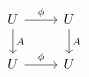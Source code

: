 \documentclass[12pt]{standalone}
\begin{document}
        $$

\begin{tikzcd}
    U \ar[r,"\phi"] \ar[d,"A"] & U \ar[d,"A"] \\
    U \ar[r,"\phi"] & U
\end{tikzcd}
        $$
        
\end{document}
